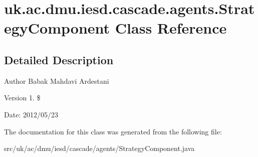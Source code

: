 \hypertarget{classuk_1_1ac_1_1dmu_1_1iesd_1_1cascade_1_1agents_1_1_strategy_component}{\section{uk.\-ac.\-dmu.\-iesd.\-cascade.\-agents.\-Strategy\-Component Class Reference}
\label{classuk_1_1ac_1_1dmu_1_1iesd_1_1cascade_1_1agents_1_1_strategy_component}
}


\subsection{Detailed Description}
\begin{DoxyAuthor}{Author}
Babak Mahdavi Ardestani 
\end{DoxyAuthor}
\begin{DoxyVersion}{Version}
1. \$ 
\end{DoxyVersion}
\begin{DoxyParagraph}{Date\-:}
2012/05/23 
\end{DoxyParagraph}


The documentation for this class was generated from the following file\-:\begin{DoxyCompactItemize}
\item 
src/uk/ac/dmu/iesd/cascade/agents/Strategy\-Component.\-java\end{DoxyCompactItemize}
